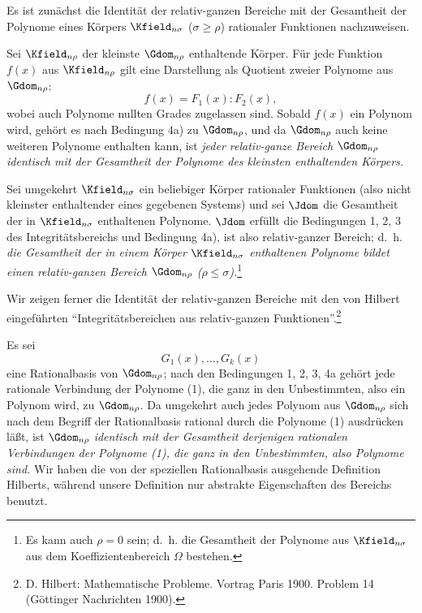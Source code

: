 \documentclass[11pt]{article}
\begin{document}
Es ist zunächst die Identität der relativ-ganzen Bereiche mit der Gesamtheit der Polynome eines Körpers $\Kfield_{n\sigma}$ ($\sigma\ge \rho$) rationaler Funktionen nachzuweisen.

Sei $\Kfield_{n\rho}$ der kleinste $\Gdom_{n\rho}$ enthaltende Körper. Für jede Funktion $f(x)$ aus $\Kfield_{n\rho}$ gilt eine Darstellung als Quotient zweier Polynome aus $\Gdom_{n\rho}$:
\[
  f(x)=F_1(x):F_2(x),
\]
wobei auch Polynome nullten Grades zugelassen sind. Sobald $f(x)$ ein Polynom wird, gehört es nach Bedingung 4a) zu $\Gdom_{n\rho}$, und da $\Gdom_{n\rho}$ auch keine weiteren Polynome enthalten kann, ist \emph{jeder relativ-ganze Bereich $\Gdom_{n\rho}$ identisch mit der Gesamtheit der Polynome des kleinsten enthaltenden Körpers.}

Sei umgekehrt $\Kfield_{n\sigma}$ ein beliebiger Körper rationaler Funktionen (also nicht kleinster enthaltender eines gegebenen Systems) und sei $\Jdom$ die Gesamtheit der in $\Kfield_{n\sigma}$ enthaltenen Polynome. $\Jdom$ erfüllt die Bedingungen 1, 2, 3 des Integritätsbereichs und Bedingung 4a), ist also relativ-ganzer Bereich; d.~h. \emph{die Gesamtheit der in einem Körper $\Kfield_{n\sigma}$ enthaltenen Polynome bildet einen relativ-ganzen Bereich $\Gdom_{n\rho}$ ($\rho\le\sigma$).}\footnote{Es kann auch $\rho=0$ sein; d.~h. die Gesamtheit der Polynome aus $\Kfield_{n\sigma}$ aus dem Koeffizientenbereich $\Omega$ bestehen.}

Wir zeigen ferner die Identität der relativ-ganzen Bereiche mit den von Hilbert eingeführten ``Integritätsbereichen aus relativ-ganzen Funktionen''.\footnote{D. Hilbert: Mathematische Probleme. Vortrag Paris 1900. Problem 14 (Göttinger Nachrichten 1900).}

Es sei
\begin{equation}
  G_1(x),\ldots,G_k(x)
\tag{1}
\end{equation}
eine Rationalbasis von $\Gdom_{n\rho}$; nach den Bedingungen 1, 2, 3, 4a gehört jede rationale Verbindung der Polynome (1), die ganz in den Unbestimmten, also ein Polynom wird, zu $\Gdom_{n\rho}$. Da umgekehrt auch jedes Polynom aus $\Gdom_{n\rho}$ sich nach dem Begriff der Rationalbasis rational durch die Polynome (1) ausdrücken läßt, ist $\Gdom_{n\rho}$ \emph{identisch mit der Gesamtheit derjenigen rationalen Verbindungen der Polynome (1), die ganz in den Unbestimmten, also Polynome sind.} Wir haben die von der speziellen Rationalbasis ausgehende Definition Hilberts, während unsere Definition nur abstrakte Eigenschaften des Bereichs benutzt.
\end{document}

